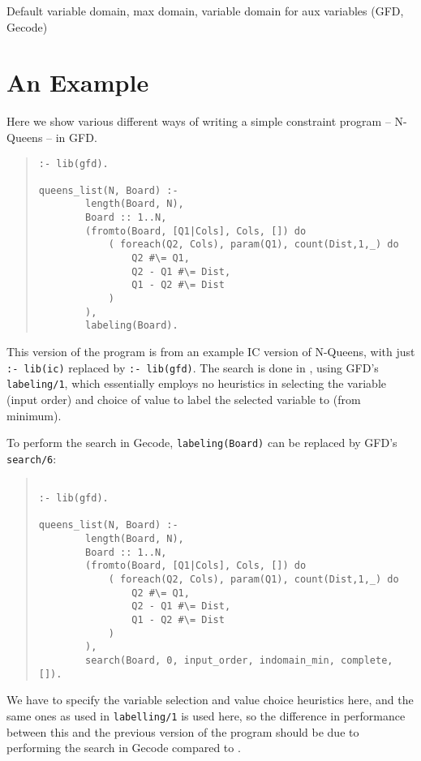 Default variable domain, max domain, variable domain for aux variables
 (GFD, Gecode)

\section{An Example}

Here we show various different ways of writing a simple constraint program --
N-Queens -- in GFD.

\begin{quote}
\begin{verbatim}
:- lib(gfd).

queens_list(N, Board) :-
        length(Board, N),
        Board :: 1..N,
        (fromto(Board, [Q1|Cols], Cols, []) do
            ( foreach(Q2, Cols), param(Q1), count(Dist,1,_) do
                Q2 #\= Q1,
                Q2 - Q1 #\= Dist,
                Q1 - Q2 #\= Dist
            )
        ),
        labeling(Board).  

\end{verbatim}
\end{quote}

This version of the program is from an example IC version of N-Queens,
with just \verb':- lib(ic)' replaced by \verb':- lib(gfd)'. The
search is done in \eclipse, using GFD's \verb'labeling/1', which essentially
employs no heuristics in selecting the variable (input order) and choice of 
value to label the selected variable to (from minimum).

To perform the search in Gecode, \verb'labeling(Board)' can be
 replaced by GFD's {\tt search/6}: 

\begin{quote}
\begin{verbatim}

:- lib(gfd).

queens_list(N, Board) :-
        length(Board, N),
        Board :: 1..N,
        (fromto(Board, [Q1|Cols], Cols, []) do
            ( foreach(Q2, Cols), param(Q1), count(Dist,1,_) do
                Q2 #\= Q1,
                Q2 - Q1 #\= Dist,
                Q1 - Q2 #\= Dist
            )
        ),
        search(Board, 0, input_order, indomain_min, complete, []).

\end{verbatim}
\end{quote}
We have to specify the variable selection and value choice heuristics here,
and the same ones as used in \verb'labelling/1' is used here, so the difference
in performance between this and the previous version of the program should be
due to performing the search in Gecode compared to \eclipse.

